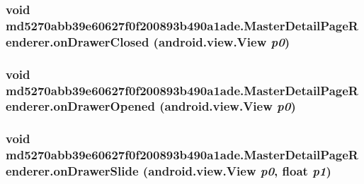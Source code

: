 \hypertarget{classmd5270abb39e60627f0f200893b490a1ade_1_1_master_detail_page_renderer_3b3b26b7b29096785254d78ed482f84e}{
\subsubsection[{onDrawerClosed}]{\setlength{\rightskip}{0pt plus 5cm}void md5270abb39e60627f0f200893b490a1ade.MasterDetailPageRenderer.onDrawerClosed (android.view.View {\em p0})}}
\label{classmd5270abb39e60627f0f200893b490a1ade_1_1_master_detail_page_renderer_3b3b26b7b29096785254d78ed482f84e}


\hypertarget{classmd5270abb39e60627f0f200893b490a1ade_1_1_master_detail_page_renderer_8f3d2e1cbbd6facc7a97f551d42aa406}{
\subsubsection[{onDrawerOpened}]{\setlength{\rightskip}{0pt plus 5cm}void md5270abb39e60627f0f200893b490a1ade.MasterDetailPageRenderer.onDrawerOpened (android.view.View {\em p0})}}
\label{classmd5270abb39e60627f0f200893b490a1ade_1_1_master_detail_page_renderer_8f3d2e1cbbd6facc7a97f551d42aa406}


\hypertarget{classmd5270abb39e60627f0f200893b490a1ade_1_1_master_detail_page_renderer_2b686422ecd14425a2f7e82787bee6c5}{
\subsubsection[{onDrawerSlide}]{\setlength{\rightskip}{0pt plus 5cm}void md5270abb39e60627f0f200893b490a1ade.MasterDetailPageRenderer.onDrawerSlide (android.view.View {\em p0}, \/  float {\em p1})}}
\label{classmd5270abb39e60627f0f200893b490a1ade_1_1_master_detail_page_renderer_2b686422ecd14425a2f7e82787bee6c5}


